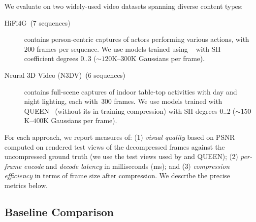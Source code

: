 %
We evaluate on two widely-used \dgs{} video datasets spanning diverse content types:
\begin{description}
  \item[HiFi4G~(7 sequences)] contains person-centric captures of actors performing various actions, with $200$ frames per sequence. We use \gs{} models trained using \vthree~\cite{v3volumetric} with SH coefficient degrees $0..3$ (${\sim}120$K--$300$K Gaussians per frame).

  \item[Neural 3D Video (N3DV)~(6 sequences)] contains full-scene captures of indoor table-top activities with day and night lighting, each with~300 frames. We use models trained with QUEEN~\cite{queen} (without its in-training compression) with SH degrees $0..2$ (${\sim}150$K--$400$K Gaussians per frame).
\end{description}

For each approach, we report measures of:
%
(1) \textit{visual quality} based on PSNR computed on rendered test views of the decompressed frames against the uncompressed ground truth (we use the test views used by \vthree and QUEEN);
%
(2) \textit{per-frame encode} and \textit{decode latency} in milliseconds (ms); and
%
(3) \textit{compression efficiency} in terms of \gs{} frame size after compression.
%
We describe the precise metrics below.

%

\subsection{Baseline Comparison}\label{sec:baseline-comparisons}




